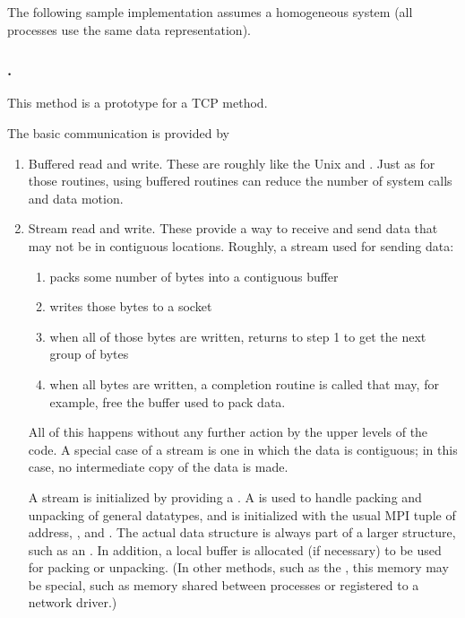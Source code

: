 
The following sample implementation assumes a homogeneous system (all
processes use the same data representation).  

\subsubsection{\tcpname.}
This method is a prototype for a TCP method.  

The basic communication is provided by
\begin{enumerate}
\item Buffered read and write.  These are roughly like the Unix
 and .  Just as for those routines, using buffered
routines can reduce the number of system calls and data motion.  

\item Stream read and write.  These provide a way to receive and send data that
may not be in contiguous locations.  Roughly, a stream used for
    sending data:
    \begin{enumerate}
    \item packs some number of bytes into a contiguous buffer
    \item writes those bytes to a socket
    \item when all of those bytes are written, returns to step 1 to
    get the next group of bytes
    \item when all bytes are written, a completion routine is called
    that may, for example, free the buffer used to pack data.
    \end{enumerate}

    All of this happens without any further action by the upper levels
    of the code.  A special case of a stream is one in which the data
    is contiguous; in this case, no intermediate copy of the data is
    made.

    A stream is initialized by providing a .  A
     is used to handle packing and unpacking of general 
    datatypes, and is initialized with the usual MPI tuple of
     address, , and .  The
    actual  data structure is always part of a larger 
    structure, such as an .  In addition, 
    a local buffer is allocated (if necessary) to be used for packing
    or unpacking.  (In other methods, such as the \shmemname, this
    memory may be special, such as memory shared between processes or
    registered to a network driver.)  


\end{enumerate}
